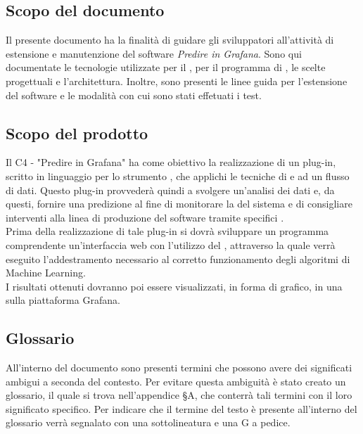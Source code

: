 \documentclass[../manuale-sviluppatore.tex]{subfiles}
\begin{document}
\subsection{Scopo del documento}%
\label{subs:scopo_del_documento}
Il presente documento ha la finalità di guidare gli sviluppatori all'attività di estensione e manutenzione del software \emph{Predire in Grafana}. Sono qui documentate le tecnologie utilizzate per il , per il programma di , le scelte progettuali e l'architettura. Inoltre, sono presenti le linee guida per l'estensione del software e le modalità con cui sono stati effetuati i test.

\subsection{Scopo del prodotto}%
\label{subs:scopo_del_prodotto}
Il  C4 - "Predire in Grafana" ha come obiettivo la realizzazione di un plug-in, scritto in linguaggio  per lo strumento  , che applichi le tecniche di   e  ad un flusso di dati. Questo plug-in provvederà quindi a svolgere un'analisi dei dati e, da questi, fornire una predizione al fine di monitorare la  del sistema e di consigliare interventi alla linea di produzione del software tramite specifici . \\
Prima della realizzazione di tale plug-in si dovrà sviluppare un programma comprendente un'interfaccia web con l'utilizzo del  , attraverso la quale verrà eseguito l'addestramento necessario al corretto funzionamento degli algoritmi di Machine Learning. \\
I risultati ottenuti dovranno poi essere visualizzati, in forma di grafico, in una  sulla piattaforma Grafana.

\subsection{Glossario}
\label{subs:glossario}
All'interno del documento sono presenti termini che possono avere dei significati ambigui a seconda del contesto. Per evitare questa ambiguità è stato creato un glossario, il quale si trova nell'appendice §A, che conterrà tali termini con il loro significato specifico. Per indicare che il termine del testo è presente all'interno del glossario verrà segnalato con una sottolineatura e una G a pedice.
\end{document}
